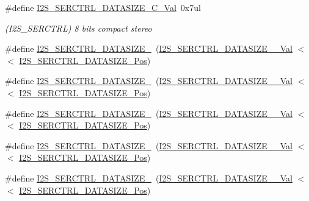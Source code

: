 \begin{DoxyCompactItemize}
\#define \mbox{\hyperlink{group___s_a_m_d21___i2_s_gaa381ab66c42f5f5dc1ac15781e4068a6}{I2\+S\+\_\+\+S\+E\+R\+C\+T\+R\+L\+\_\+\+D\+A\+T\+A\+S\+I\+Z\+E\+\_\+C\+\_\+\+Val}}~0x7ul
\begin{DoxyCompactList}\small\item\em (I2\+S\+\_\+\+S\+E\+R\+C\+T\+RL) 8 bits compact stereo \end{DoxyCompactList}\item 
\#define \mbox{\hyperlink{group___s_a_m_d21___i2_s_ga502cc873398e338852723e7d0d98890e}{I2\+S\+\_\+\+S\+E\+R\+C\+T\+R\+L\+\_\+\+D\+A\+T\+A\+S\+I\+Z\+E\+\_}}~(\mbox{\hyperlink{group___s_a_m_d21___i2_s_gaf6d6db384e5e6f3bb0490f6312d91ed7}{I2\+S\+\_\+\+S\+E\+R\+C\+T\+R\+L\+\_\+\+D\+A\+T\+A\+S\+I\+Z\+E\+\_\+\_\+\+Val}}   $<$$<$ \mbox{\hyperlink{group___s_a_m_d21___i2_s_gacf8b6693f0fedbcbc080607dcf13c0c2}{I2\+S\+\_\+\+S\+E\+R\+C\+T\+R\+L\+\_\+\+D\+A\+T\+A\+S\+I\+Z\+E\+\_\+\+Pos}})
\item 
\#define \mbox{\hyperlink{group___s_a_m_d21___i2_s_ga7a5fbf7aae5fc1da5de73a8963a463f2}{I2\+S\+\_\+\+S\+E\+R\+C\+T\+R\+L\+\_\+\+D\+A\+T\+A\+S\+I\+Z\+E\+\_}}~(\mbox{\hyperlink{group___s_a_m_d21___i2_s_ga8e42011d7f151e6e19ebdacf35bdfed1}{I2\+S\+\_\+\+S\+E\+R\+C\+T\+R\+L\+\_\+\+D\+A\+T\+A\+S\+I\+Z\+E\+\_\+\_\+\+Val}}   $<$$<$ \mbox{\hyperlink{group___s_a_m_d21___i2_s_gacf8b6693f0fedbcbc080607dcf13c0c2}{I2\+S\+\_\+\+S\+E\+R\+C\+T\+R\+L\+\_\+\+D\+A\+T\+A\+S\+I\+Z\+E\+\_\+\+Pos}})
\item 
\#define \mbox{\hyperlink{group___s_a_m_d21___i2_s_gaf18d13a1948f6ff0fd4a4b3f1dc46bf7}{I2\+S\+\_\+\+S\+E\+R\+C\+T\+R\+L\+\_\+\+D\+A\+T\+A\+S\+I\+Z\+E\+\_}}~(\mbox{\hyperlink{group___s_a_m_d21___i2_s_ga0b83fc41259df61dc2a04cd386d4afcb}{I2\+S\+\_\+\+S\+E\+R\+C\+T\+R\+L\+\_\+\+D\+A\+T\+A\+S\+I\+Z\+E\+\_\+\_\+\+Val}}   $<$$<$ \mbox{\hyperlink{group___s_a_m_d21___i2_s_gacf8b6693f0fedbcbc080607dcf13c0c2}{I2\+S\+\_\+\+S\+E\+R\+C\+T\+R\+L\+\_\+\+D\+A\+T\+A\+S\+I\+Z\+E\+\_\+\+Pos}})
\item 
\#define \mbox{\hyperlink{group___s_a_m_d21___i2_s_gacc7a7473cdfe1aba9c4bac5d3ca6ab05}{I2\+S\+\_\+\+S\+E\+R\+C\+T\+R\+L\+\_\+\+D\+A\+T\+A\+S\+I\+Z\+E\+\_}}~(\mbox{\hyperlink{group___s_a_m_d21___i2_s_ga7ed3fda53f4e7cd66daf99de07f7b72c}{I2\+S\+\_\+\+S\+E\+R\+C\+T\+R\+L\+\_\+\+D\+A\+T\+A\+S\+I\+Z\+E\+\_\+\_\+\+Val}}   $<$$<$ \mbox{\hyperlink{group___s_a_m_d21___i2_s_gacf8b6693f0fedbcbc080607dcf13c0c2}{I2\+S\+\_\+\+S\+E\+R\+C\+T\+R\+L\+\_\+\+D\+A\+T\+A\+S\+I\+Z\+E\+\_\+\+Pos}})
\item 
\#define \mbox{\hyperlink{group___s_a_m_d21___i2_s_ga23198bedf56c36e775d77f91d72524ad}{I2\+S\+\_\+\+S\+E\+R\+C\+T\+R\+L\+\_\+\+D\+A\+T\+A\+S\+I\+Z\+E\+\_}}~(\mbox{\hyperlink{group___s_a_m_d21___i2_s_ga29881b7370baf689e9b9bcca4852f196}{I2\+S\+\_\+\+S\+E\+R\+C\+T\+R\+L\+\_\+\+D\+A\+T\+A\+S\+I\+Z\+E\+\_\+\_\+\+Val}}   $<$$<$ \mbox{\hyperlink{group___s_a_m_d21___i2_s_gacf8b6693f0fedbcbc080607dcf13c0c2}{I2\+S\+\_\+\+S\+E\+R\+C\+T\+R\+L\+\_\+\+D\+A\+T\+A\+S\+I\+Z\+E\+\_\+\+Pos}})
$$
\end{DoxyCompactItemize}

